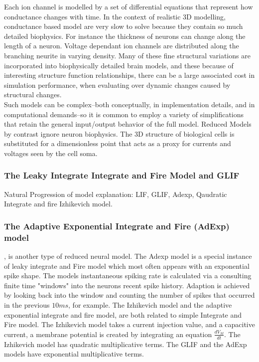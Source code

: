 Each ion channel is modelled by a set of differential equations that represent how conductance changes with time. In the context of realistic 3D modelling, conductance based model are very slow to solve because they contain so much detailed biophysics. For instance the thickness of neurons can change along the length of a neuron. Voltage dependant ion channels are distributed along the branching neurite in varying density. Many of these fine structural variations are incorporated into biophysically detailed brain models, and these because of interesting structure function relationships, there can be a large associated cost in simulation performance, when evaluating over dynamic changes caused by structural changes.\\
Such models can be complex--both conceptually, in implementation details, and in computational demands--so it is common to employ a variety of simplifications that retain the general input/output behavior of the full model. Reduced Models by contrast ignore neuron biophysics. The 3D structure of biological cells is substituted for a dimensionless point that acts as a proxy for currents and voltages seen by the cell soma. 

\subsubsection{The Leaky Integrate Integrate and Fire Model and GLIF}
Natural Progression of model explanation: LIF, GLIF, Adexp, Qaudratic Integrate and fire Izhikevich model. %
\subsubsection{The Adaptive Exponential Integrate and Fire (AdExp) model} \cite{brette2005adaptive}, is another type of reduced neural model. The Adexp model is a special instance of leaky integrate and Fire model which most often appears with an exponential spike shape. The models instantaneous spiking rate is calculated via a consulting finite time "windows" into the neurons recent spike history. Adaption is achieved by looking back into the window and counting the number of spikes that occurred in the previous $10ms$, for example. 
The Izhikevich model and the adaptive exponential integrate and fire model, are both related to simple Integrate and Fire model. The Izhikevich model takes a current injection value, and a capacitive current, a membrane potential is created by integrating an equation $\frac{d V_{M}}{dt}$. The Izhikevich model has quadratic multiplicative terms. The GLIF and the AdExp models have exponential multiplicative terms.

